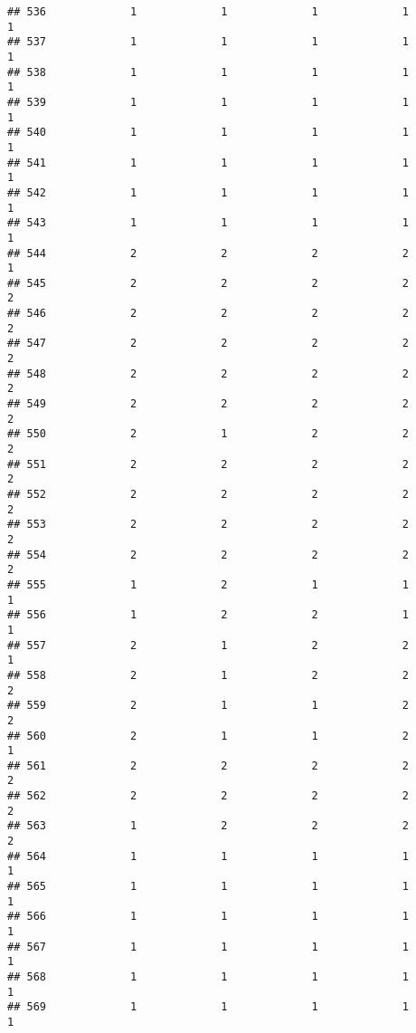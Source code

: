 \documentclass[
]{article}
\begin{document}
\begin{verbatim}
## 536             1             1             1             1             1
## 537             1             1             1             1             1
## 538             1             1             1             1             1
## 539             1             1             1             1             1
## 540             1             1             1             1             1
## 541             1             1             1             1             1
## 542             1             1             1             1             1
## 543             1             1             1             1             1
## 544             2             2             2             2             1
## 545             2             2             2             2             2
## 546             2             2             2             2             2
## 547             2             2             2             2             2
## 548             2             2             2             2             2
## 549             2             2             2             2             2
## 550             2             1             2             2             2
## 551             2             2             2             2             2
## 552             2             2             2             2             2
## 553             2             2             2             2             2
## 554             2             2             2             2             2
## 555             1             2             1             1             1
## 556             1             2             2             1             1
## 557             2             1             2             2             1
## 558             2             1             2             2             2
## 559             2             1             1             2             2
## 560             2             1             1             2             1
## 561             2             2             2             2             2
## 562             2             2             2             2             2
## 563             1             2             2             2             2
## 564             1             1             1             1             1
## 565             1             1             1             1             1
## 566             1             1             1             1             1
## 567             1             1             1             1             1
## 568             1             1             1             1             1
## 569             1             1             1             1             1

\end{verbatim}
\end{document}
